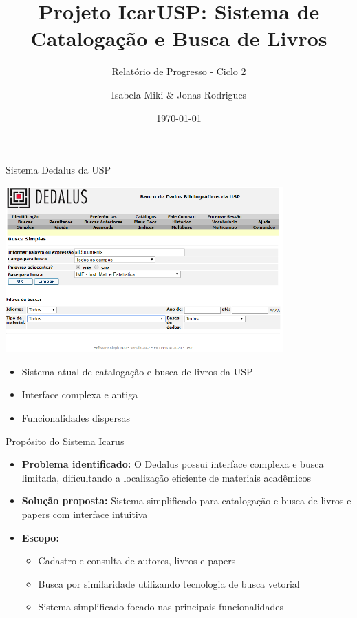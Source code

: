 \documentclass{beamer}
\title{Projeto IcarUSP: Sistema de Catalogação e Busca de Livros}
\subtitle{Relatório de Progresso - Ciclo 2}
\author{Isabela Miki \& Jonas Rodrigues}
\date{\today}
\begin{document}
\begin{frame}
\titlepage
\end{frame}

\begin{frame}{Sistema Dedalus da USP}
\begin{center}
\includegraphics[width=0.8\textwidth]{dedalus.png}
\end{center}
\vspace{0.5cm}
\begin{itemize}
\item Sistema atual de catalogação e busca de livros da USP
\item Interface complexa e antiga
\item Funcionalidades dispersas
\end{itemize}
\end{frame}

\begin{frame}{Propósito do Sistema Icarus}
\begin{itemize}
\item \textbf{Problema identificado:} O Dedalus possui interface complexa e
busca limitada, dificultando a localização eficiente de materiais acadêmicos
\item \textbf{Solução proposta:} Sistema simplificado para catalogação e busca
de livros e papers com interface intuitiva
\item \textbf{Escopo:}
    \begin{itemize}
    \item Cadastro e consulta de autores, livros e papers
    \item Busca por similaridade utilizando tecnologia de busca vetorial
    \item Sistema simplificado focado nas principais funcionalidades
    \end{itemize}
\end{itemize}
\end{frame}
\end{document}
